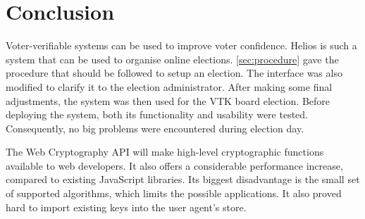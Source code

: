 % 
%

\section{Conclusion}

Voter-verifiable systems can be used to improve voter confidence. Helios is such a system that can be used to organise online elections. \ref{sec:procedure} gave the procedure that should be followed to setup an election. The interface was also modified to clarify it to the election administrator. After making some final adjustments, the system was then used for the VTK board election. Before deploying the system, both its functionality and usability were tested. Consequently, no big problems were encountered during election day.

\par The Web Cryptography API will make high-level cryptographic functions available to web developers. It also offers a considerable performance increase, compared to existing JavaScript libraries. Its biggest disadvantage is the small set of supported algorithms, which limits the possible applications. It also proved hard to import existing keys into the user agent's store.
